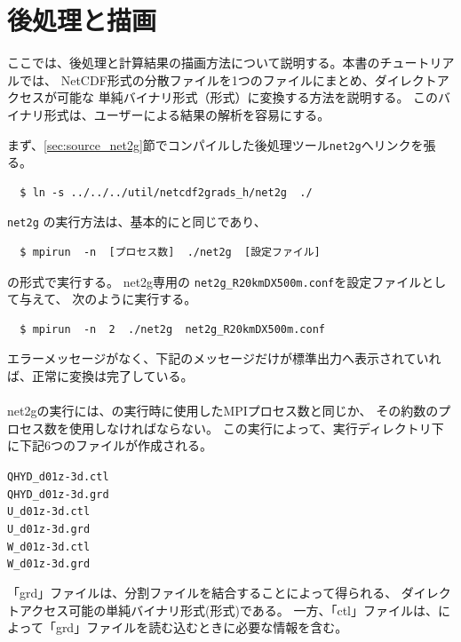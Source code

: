 \section{後処理と描画} \label{sec:ideal_exp_net2g}
ここでは、後処理と計算結果の描画方法について説明する。本書のチュートリアルでは、
NetCDF形式の分散ファイルを1つのファイルにまとめ、ダイレクトアクセスが可能な
単純バイナリ形式（\grads 形式）に変換する方法を説明する。
このバイナリ形式は、ユーザーによる結果の解析を容易にする。

まず、\ref{sec:source_net2g}節でコンパイルした後処理ツール\verb|net2g|へリンクを張る。
\begin{verbatim}
  $ ln -s ../../../util/netcdf2grads_h/net2g  ./
\end{verbatim}

\verb|net2g| の実行方法は、基本的に{\scalerm}と同じであり、
\begin{verbatim}
  $ mpirun  -n  [プロセス数]  ./net2g  [設定ファイル]
\end{verbatim}
の形式で実行する。
net2g専用の \verb|net2g_R20kmDX500m.conf|を設定ファイルとして与えて、
次のように実行する。
\begin{verbatim}
  $ mpirun  -n  2  ./net2g  net2g_R20kmDX500m.conf
\end{verbatim}
エラーメッセージがなく、下記のメッセージだけが標準出力へ表示されていれば、正常に変換は完了している。\\

\\

\noindent net2gの実行には、{\scalerm}の実行時に使用したMPIプロセス数と同じか、
その約数のプロセス数を使用しなければならない。
この実行によって、実行ディレクトリ下に下記6つのファイルが作成される。
\begin{alltt}
  QHYD_d01z-3d.ctl
  QHYD_d01z-3d.grd
  U_d01z-3d.ctl
  U_d01z-3d.grd
  W_d01z-3d.ctl
  W_d01z-3d.grd
\end{alltt}
「grd」ファイルは、分割ファイルを結合することによって得られる、
ダイレクトアクセス可能の単純バイナリ形式(\grads 形式)である。
一方、「ctl」ファイルは、\grads によって「grd」ファイルを読む込むときに必要な情報を含む。

